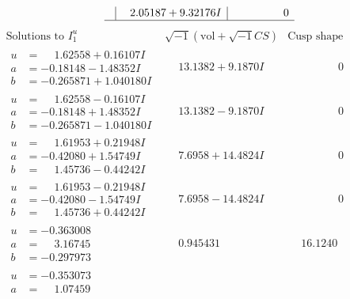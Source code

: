\documentclass[1p]{elsarticle_modified}
\theoremstyle{definition}
\newcommand{\I}{\sqrt{-1}}
\begin{document}
$$\begin{array}{c|c|c}
 & \phantom{-}2.05187 + 9.32176 I & \phantom{-0.000000 } 0\\
 \hline 
 \end{array}$$\newpage$$\begin{array}{c|c|c}  
\text{Solutions to }I^u_{1}& \I (\text{vol} + \sqrt{-1}CS) & \text{Cusp shape}\\
 \hline 
\begin{aligned}
u &= \phantom{-}1.62558 + 0.16107 I \\
a &= -0.18148 - 1.48352 I \\
b &= -0.265871 + 1.040180 I\end{aligned}
 & \phantom{-}13.1382 + 9.1870 I & \phantom{-0.000000 } 0 \\ \hline\begin{aligned}
u &= \phantom{-}1.62558 - 0.16107 I \\
a &= -0.18148 + 1.48352 I \\
b &= -0.265871 - 1.040180 I\end{aligned}
 & \phantom{-}13.1382 - 9.1870 I & \phantom{-0.000000 } 0 \\ \hline\begin{aligned}
u &= \phantom{-}1.61953 + 0.21948 I \\
a &= -0.42080 + 1.54749 I \\
b &= \phantom{-}1.45736 - 0.44242 I\end{aligned}
 & \phantom{-}7.6958 + 14.4824 I & \phantom{-0.000000 } 0 \\ \hline\begin{aligned}
u &= \phantom{-}1.61953 - 0.21948 I \\
a &= -0.42080 - 1.54749 I \\
b &= \phantom{-}1.45736 + 0.44242 I\end{aligned}
 & \phantom{-}7.6958 - 14.4824 I & \phantom{-0.000000 } 0 \\ \hline\begin{aligned}
u &= -0.363008\phantom{ +0.000000I} \\
a &= \phantom{-}3.16745\phantom{ +0.000000I} \\
b &= -0.297973\phantom{ +0.000000I}\end{aligned}
 & \phantom{-}0.945431\phantom{ +0.000000I} & \phantom{-}16.1240\phantom{ +0.000000I} \\ \hline\begin{aligned}
u &= -0.353073\phantom{ +0.000000I} \\
a &= \phantom{-}1.07459\phantom{ +0.000000I} \\

\end{aligned}
\end{array}$$
\end{document}
